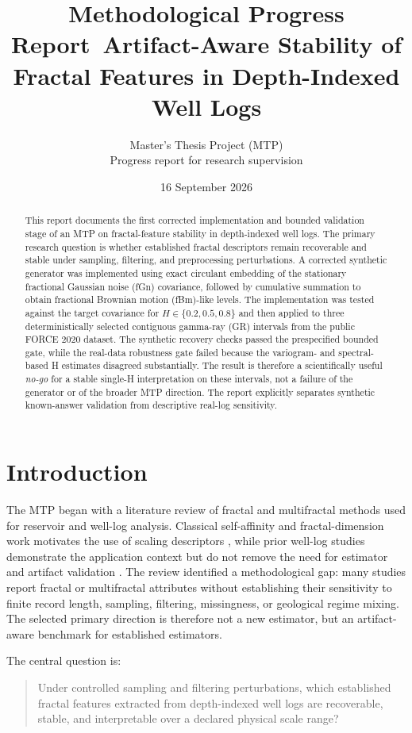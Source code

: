 \documentclass[11pt,a4paper]{article}
\title{\textbf{Methodological Progress Report}\
\large Artifact-Aware Stability of Fractal Features in Depth-Indexed Well Logs}
\author{Master's Thesis Project (MTP)\\Progress report for research supervision}
\date{16 September 2026}
\begin{document}
\maketitle
\begin{abstract}
This report documents the first corrected implementation and bounded validation stage of an MTP on fractal-feature stability in depth-indexed well logs. The primary research question is whether established fractal descriptors remain recoverable and stable under sampling, filtering, and preprocessing perturbations. A corrected synthetic generator was implemented using exact circulant embedding of the stationary fractional Gaussian noise (fGn) covariance, followed by cumulative summation to obtain fractional Brownian motion (fBm)-like levels. The implementation was tested against the target covariance for $H\in\{0.2,0.5,0.8\}$ and then applied to three deterministically selected contiguous gamma-ray (GR) intervals from the public FORCE 2020 dataset. The synthetic recovery checks passed the prespecified bounded gate, while the real-data robustness gate failed because the variogram- and spectral-based H estimates disagreed substantially. The result is therefore a scientifically useful \emph{no-go} for a stable single-H interpretation on these intervals, not a failure of the generator or of the broader MTP direction. The report explicitly separates synthetic known-answer validation from descriptive real-log sensitivity.
\end{abstract}

\section{Introduction}
The MTP began with a literature review of fractal and multifractal methods used for reservoir and well-log analysis. Classical self-affinity and fractal-dimension work motivates the use of scaling descriptors \cite{hardy_fractals,schepers1992,hough1989}, while prior well-log studies demonstrate the application context but do not remove the need for estimator and artifact validation \cite{li2001,li2003,rahimi2018,partovi2017}. The review identified a methodological gap: many studies report fractal or multifractal attributes without establishing their sensitivity to finite record length, sampling, filtering, missingness, or geological regime mixing. The selected primary direction is therefore not a new estimator, but an artifact-aware benchmark for established estimators.

The central question is:
\begin{quote}
Under controlled sampling and filtering perturbations, which established fractal features extracted from depth-indexed well logs are recoverable, stable, and interpretable over a declared physical scale range?
\end{quote}
\end{document}
